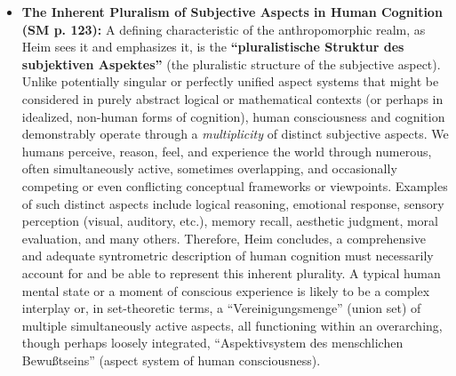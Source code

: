 \documentclass[12pt]{article}
\newcommand{\q}[1]{\enquote{#1}}
\begin{document}
\begin{itemize}
    \item \textbf{The Inherent Pluralism of Subjective Aspects in Human Cognition (SM p. 123):}
    A defining characteristic of the anthropomorphic realm, as Heim sees it and emphasizes it, is the \textbf{\q{pluralistische Struktur des subjektiven Aspektes}} (the pluralistic structure of the subjective aspect). Unlike potentially singular or perfectly unified aspect systems that might be considered in purely abstract logical or mathematical contexts (or perhaps in idealized, non-human forms of cognition), human consciousness and cognition demonstrably operate through a \textit{multiplicity} of distinct subjective aspects. We humans perceive, reason, feel, and experience the world through numerous, often simultaneously active, sometimes overlapping, and occasionally competing or even conflicting conceptual frameworks or viewpoints. Examples of such distinct aspects include logical reasoning, emotional response, sensory perception (visual, auditory, etc.), memory recall, aesthetic judgment, moral evaluation, and many others. Therefore, Heim concludes, a comprehensive and adequate syntrometric description of human cognition must necessarily account for and be able to represent this inherent plurality. A typical human mental state or a moment of conscious experience is likely to be a complex interplay or, in set-theoretic terms, a \q{Vereinigungsmenge} (union set) of multiple simultaneously active aspects, all functioning within an overarching, though perhaps loosely integrated, \q{Aspektivsystem des menschlichen Bewußtseins} (aspect system of human consciousness).


\end{itemize}
\end{document}
